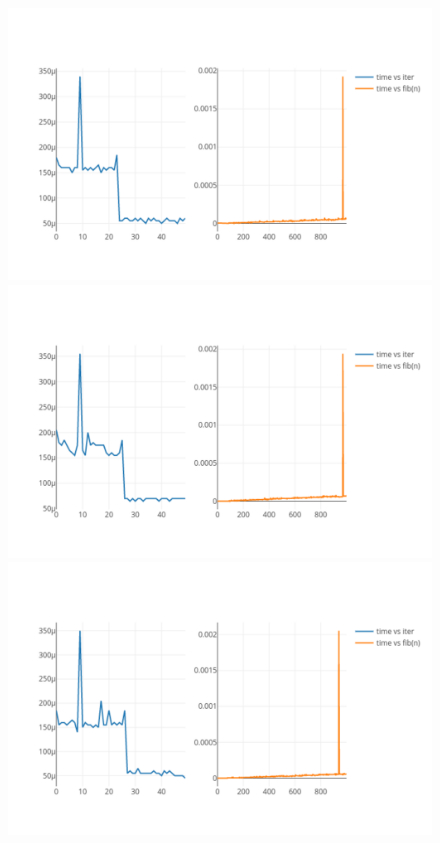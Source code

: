 \documentclass[onecolumn]{preport}
\begin{document}
\begin{figure}[H]
\begin{center}
\begin{minipage}{0.23\columnwidth}
      \subcaption{}
    \end{minipage}
    \begin{minipage}{0.23\columnwidth}   
      \includegraphics[width=\columnwidth]{figs/newplot13.pdf}
      \subcaption{}
    \end{minipage}
    \begin{minipage}{0.23\columnwidth}   
      \includegraphics[width=\columnwidth]{figs/newplot14.pdf}
      \subcaption{}
    \end{minipage}
    \begin{minipage}{0.23\columnwidth}   
      \includegraphics[width=\columnwidth]{figs/newplot15.pdf}

\end{minipage}
\end{center}
\end{figure}
\end{document}
